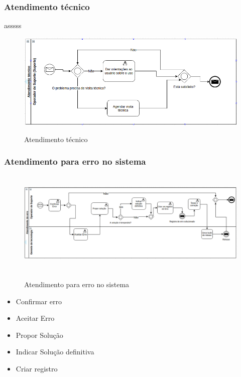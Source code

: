 \documentclass[11pt,a4paper]{article}
\begin{document}
\subsubsection{Atendimento técnico}
asssss
\begin{figure}[!h]
\caption{Atendimento técnico}
\centering %
\includegraphics[width=15cm]{as-is/02_atendimento_tecnico.png}
\label{figura:suporte_tecnico_as_is}
\end{figure}

\subsubsection{Atendimento para erro no sistema}

\begin{figure}[!h]
\caption{Atendimento para erro no sistema}
\centering %
\includegraphics[width=16cm, height=5cm]{as-is/03_atendimento_de_erro.png}
\label{figura:atendimento_de_erro_as_is}
\end{figure}
\begin{itemize}
	\item Confirmar erro
	\item Aceitar Erro
	\item Propor Solução
	\item Indicar Solução definitiva
	\item Criar registro
\end{itemize}
\end{document}

